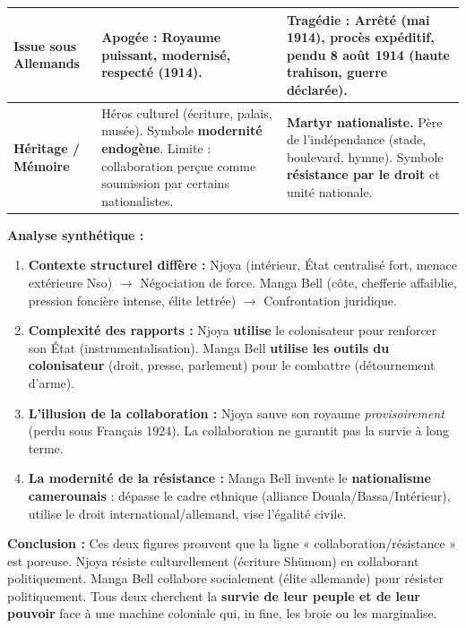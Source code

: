 \documentclass[11pt]{article}
\begin{document}
\begin{exoresolu}
\begin{center}
\begin{tabularx}{\linewidth}{|l|X|X|}
\hline
\textbf{Issue sous Allemands} & \textbf{Apogée :} Royaume puissant, modernisé, respecté (1914). & \textbf{Tragédie :} Arrêté (mai 1914), procès expéditif, \textbf{pendu 8 août 1914} (haute trahison, guerre déclarée). \\
\hline
\textbf{Héritage / Mémoire} & Héros culturel (écriture, palais, musée). Symbole \textbf{modernité endogène}. Limite : collaboration perçue comme soumission par certains nationalistes. & \textbf{Martyr nationaliste.} Père de l'indépendance (stade, boulevard, hymne). Symbole \textbf{résistance par le droit} et unité nationale. \\
\hline
\end{tabularx}
\end{center}
\textbf{Analyse synthétique :}
\begin{enumerate}
    \item \textbf{Contexte structurel diffère :} Njoya (intérieur, État centralisé fort, menace extérieure Nso) $\rightarrow$ Négociation de force. Manga Bell (côte, chefferie affaiblie, pression foncière intense, élite lettrée) $\rightarrow$ Confrontation juridique.
    \item \textbf{Complexité des rapports :} Njoya \textbf{utilise} le colonisateur pour renforcer son État (instrumentalisation). Manga Bell \textbf{utilise les outils du colonisateur} (droit, presse, parlement) pour le combattre (détournement d'arme).
    \item \textbf{L'illusion de la collaboration :} Njoya sauve son royaume \emph{provisoirement} (perdu sous Français 1924). La collaboration ne garantit pas la survie à long terme.
    \item \textbf{La modernité de la résistance :} Manga Bell invente le \textbf{nationalisme camerounais} : dépasse le cadre ethnique (alliance Douala/Bassa/Intérieur), utilise le droit international/allemand, vise l'égalité civile.
\end{enumerate}
\textbf{Conclusion :} Ces deux figures prouvent que la ligne « collaboration/résistance » est poreuse. Njoya résiste culturellement (écriture Shümom) en collaborant politiquement. Manga Bell collabore socialement (élite allemande) pour résister politiquement. Tous deux cherchent la \textbf{survie de leur peuple et de leur pouvoir} face à une machine coloniale qui, in fine, les broie ou les marginalise.
\end{exoresolu}
\end{document}
